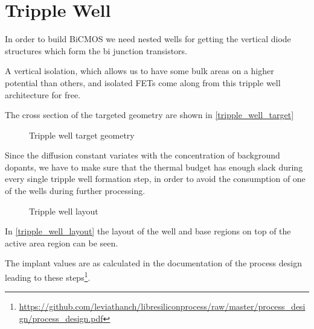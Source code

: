 \section{Tripple Well}\label{tripple_well_chapter}

In order to build BiCMOS we need nested wells for getting the vertical diode structures which form the bi junction transistors.

A vertical isolation, which allows us to have some bulk areas on a higher potential than others, and isolated FETs come along from this tripple well architecture for free.

The cross section of the targeted geometry are shown in \autoref{tripple_well_target}

\begin{figure}[H]
	\centering
	\begin{tikzpicture}[node distance = 3cm, auto, thick,scale=\CrossAndTopSectionBig, every node/.style={transform shape}]
		
	\end{tikzpicture}
	\caption{Tripple well target geometry}
	\label{tripple_well_target}
\end{figure}

Since the diffusion constant variates with the concentration of background dopants, we have to make sure that the thermal budget has enough slack during every single tripple well formation step, in order to avoid the consumption of one of the wells during further processing.

\begin{figure}[H]
	\centering
	\begin{tikzpicture}[node distance =1cm, auto, thick,scale=\VLSILayout, every node/.style={transform shape}]
		
	\end{tikzpicture}
	\caption{Tripple well layout}
	\label{tripple_well_layout}
\end{figure}

In \autoref{tripple_well_layout} the layout of the well and base regions on top of the active area region can be seen.

The implant values are as calculated in the documentation of the process design leading to these steps\footnote{\url{https://github.com/leviathanch/libresiliconprocess/raw/master/process_design/process_design.pdf}}.

\newpage


\newpage




